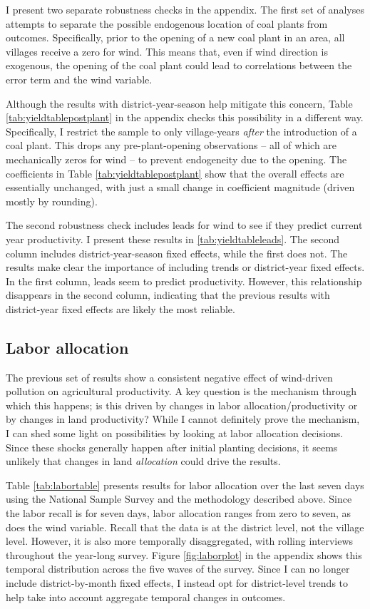 \documentclass[
]{article}
\begin{document}
I present two separate robustness checks in the appendix. The first set of analyses attempts to separate the possible endogenous location of coal plants from outcomes. Specifically, prior to the opening of a new coal plant in an area, all villages receive a zero for wind. This means that, even if wind direction is exogenous, the opening of the coal plant could lead to correlations between the error term and the wind variable.

Although the results with district-year-season help mitigate this concern, Table \ref{tab:yieldtablepostplant} in the appendix checks this possibility in a different way. Specifically, I restrict the sample to only village-years \emph{after} the introduction of a coal plant. This drops any pre-plant-opening observations -- all of which are mechanically zeros for wind -- to prevent endogeneity due to the opening. The coefficients in Table \ref{tab:yieldtablepostplant} show that the overall effects are essentially unchanged, with just a small change in coefficient magnitude (driven mostly by rounding).

The second robustness check includes leads for wind to see if they predict current year productivity. I present these results in \ref{tab:yieldtableleads}. The second column includes district-year-season fixed effects, while the first does not. The results make clear the importance of including trends or district-year fixed effects. In the first column, leads seem to predict productivity. However, this relationship disappears in the second column, indicating that the previous results with district-year fixed effects are likely the most reliable.

\hypertarget{labor-allocation}{%
\subsection{Labor allocation}\label{labor-allocation}}

The previous set of results show a consistent negative effect of wind-driven pollution on agricultural productivity. A key question is the mechanism through which this happens; is this driven by changes in labor allocation/productivity or by changes in land productivity? While I cannot definitely prove the mechanism, I can shed some light on possibilities by looking at labor allocation decisions. Since these shocks generally happen after initial planting decisions, it seems unlikely that changes in land \emph{allocation} could drive the results.

Table \ref{tab:labortable} presents results for labor allocation over the last seven days using the National Sample Survey and the methodology described above. Since the labor recall is for seven days, labor allocation ranges from zero to seven, as does the wind variable. Recall that the data is at the district level, not the village level. However, it is also more temporally disaggregated, with rolling interviews throughout the year-long survey. Figure \ref{fig:laborplot} in the appendix shows this temporal distribution across the five waves of the survey. Since I can no longer include district-by-month fixed effects, I instead opt for district-level trends to help take into account aggregate temporal changes in outcomes.
\end{document}
